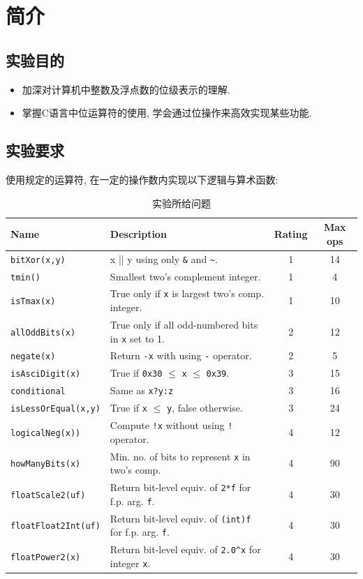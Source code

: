 
\section{简介}

\subsection{实验目的}
\begin{itemize}
    \item 加深对计算机中整数及浮点数的位级表示的理解.
    \item 掌握C语言中位运算符的使用, 学会通过位操作来高效实现某些功能.
\end{itemize}
\subsection{实验要求}

使用规定的运算符, 在一定的操作数内实现以下逻辑与算术函数:

\begin{table}[H]
    \centering
    \footnotesize
    \begin{tabular}{llcc}
        \toprule
        Name & Description & Rating & Max ops \\
        \midrule
        \verb|bitXor(x,y)| & x || y using only \verb|&| and \verb|~|. & 1 & 14 \\
        \verb|tmin()| & Smallest two’s complement integer. & 1 & 4 \\
        \verb|isTmax(x)| & True only if \verb|x| is largest two's comp. integer. & 1 & 10 \\
        \verb|allOddBits(x)| & True only if all odd-numbered bits in \verb|x| set to 1. & 2 & 12 \\
        \verb|negate(x)| & Return \verb|-x| with using \verb|-| operator. & 2 & 5 \\
        \verb|isAsciDigit(x)| & True if \verb|0x30| $\leq$ \verb|x| $\leq$ \verb|0x39|. & 3 & 15 \\
        \verb|conditional| & Same as \verb|x?y:z| & 3 & 16 \\
        \verb|isLessOrEqual(x,y)| & True if \verb|x| $\leq$ \verb|y|, false otherwise. & 3 & 24 \\
        \verb|logicalNeg(x))| & Compute \verb|!x| without using \verb|!| operator. & 4 & 12 \\
        \verb|howManyBits(x)| & Min. no. of bits to represent \verb|x| in two’s comp. & 4 & 90 \\
        \verb|floatScale2(uf)| & Return bit-level equiv. of \verb|2*f| for f.p. arg. \verb|f|. & 4 & 30 \\
        \verb|floatFloat2Int(uf)| & Return bit-level equiv. of \verb|(int)f| for f.p. arg. \verb|f|. & 4 & 30 \\
        \verb|floatPower2(x)| & Return bit-level equiv. of \verb|2.0^x| for integer \verb|x|. & 4 & 30 \\
        \bottomrule
    \end{tabular}
    \caption{实验所给问题}
\end{table}


